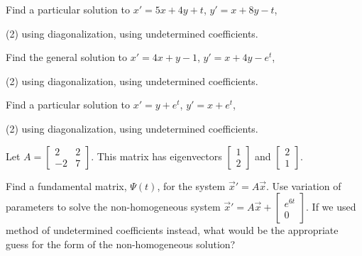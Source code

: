 \begin{exercise}\ansMark%
Find a particular solution to $x' = 5x + 4y + t$, $y' = x + 8y - t$,
\begin{tasks}(2)
\task using diagonalization,
\task using undetermined coefficients.
\end{tasks}
\end{exercise}

\begin{exercise}
Find the general solution to
$x' = 4x+ y -1$, 
$y' = x + 4y -e^t$,
\begin{tasks}(2)
\task using diagonalization,
\task using undetermined coefficients.
\end{tasks}
\end{exercise}

\begin{exercise}\ansMark%
Find a particular solution to $x' = y + e^t$, $y' = x +e^t$,
\begin{tasks}(2)
\task using diagonalization,
\task using undetermined coefficients.
\end{tasks}
\end{exercise}

\begin{exercise}
Let $A=\displaystyle \begin{bmatrix}2&2\\-2&7\end{bmatrix}$. This matrix has eigenvectors $\displaystyle \begin{bmatrix} 1 \\ 2 \end{bmatrix}$ and $\displaystyle \begin{bmatrix} 2 \\ 1 \end{bmatrix}$.
\begin{tasks}
\task Find a fundamental matrix, $\Psi(t)$, for the system $\vec{x}'=A\vec{x}$.
\task Use variation of parameters to solve the non-homogeneous system $\vec{x}'=A\vec{x}+\displaystyle \begin{bmatrix}e^{6t} \\ 0 \end{bmatrix}$.
\task If we used method of undetermined coefficients instead, what would be the appropriate guess for the form of the non-homogeneous solution?
\end{tasks}
\end{exercise}

